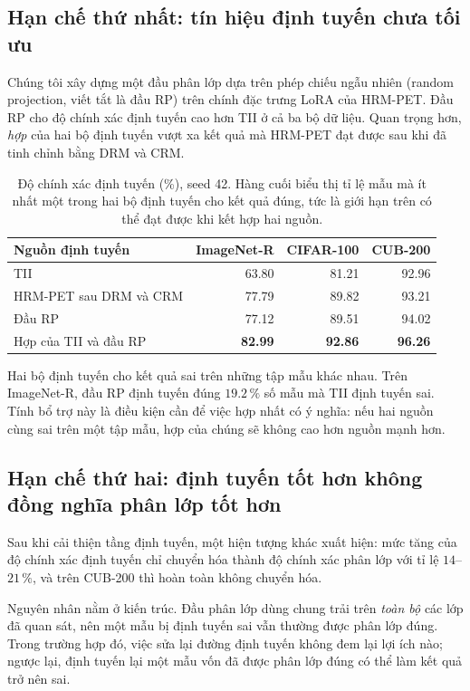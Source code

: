 \documentclass[11pt,a4paper]{article}
\begin{document}
\subsection{Hạn chế thứ nhất: tín hiệu định tuyến chưa tối ưu}

Chúng tôi xây dựng một đầu phân lớp dựa trên phép chiếu ngẫu nhiên (random
projection, viết tắt là đầu RP) trên chính đặc trưng LoRA của HRM-PET. Đầu RP
cho độ chính xác định tuyến cao hơn TII ở cả ba bộ dữ liệu. Quan trọng hơn,
\emph{hợp} của hai bộ định tuyến vượt xa kết quả mà HRM-PET đạt được sau khi đã
tinh chỉnh bằng DRM và CRM.

\begin{table}[htbp]
\centering
\caption{Độ chính xác định tuyến (\%), seed 42. Hàng cuối biểu thị tỉ lệ mẫu mà
ít nhất một trong hai bộ định tuyến cho kết quả đúng, tức là giới hạn trên có
thể đạt được khi kết hợp hai nguồn.}
\label{tab:routing}
\begin{tabular}{lrrr}
\toprule
Nguồn định tuyến & ImageNet-R & CIFAR-100 & CUB-200 \\
\midrule
TII                        & 63.80 & 81.21 & 92.96 \\
HRM-PET sau DRM và CRM     & 77.79 & 89.82 & 93.21 \\
Đầu RP                     & 77.12 & 89.51 & 94.02 \\
\midrule
Hợp của TII và đầu RP      & \textbf{82.99} & \textbf{92.86} & \textbf{96.26} \\
\bottomrule
\end{tabular}
\end{table}

Hai bộ định tuyến cho kết quả sai trên những tập mẫu khác nhau. Trên ImageNet-R,
đầu RP định tuyến đúng $19.2\,\%$ số mẫu mà TII định tuyến sai. Tính bổ trợ này
là điều kiện cần để việc hợp nhất có ý nghĩa: nếu hai nguồn cùng sai trên một
tập mẫu, hợp của chúng sẽ không cao hơn nguồn mạnh hơn.

\subsection{Hạn chế thứ hai: định tuyến tốt hơn không đồng nghĩa phân lớp tốt hơn}

Sau khi cải thiện tầng định tuyến, một hiện tượng khác xuất hiện: mức tăng của
độ chính xác định tuyến chỉ chuyển hóa thành độ chính xác phân lớp với tỉ lệ
$14$--$21\,\%$, và trên CUB-200 thì hoàn toàn không chuyển hóa.

Nguyên nhân nằm ở kiến trúc. Đầu phân lớp dùng chung trải trên \emph{toàn bộ}
các lớp đã quan sát, nên một mẫu bị định tuyến sai vẫn thường được phân lớp
đúng. Trong trường hợp đó, việc sửa lại đường định tuyến không đem lại lợi ích
nào; ngược lại, định tuyến lại một mẫu vốn đã được phân lớp đúng có thể làm kết
quả trở nên sai.
\end{document}
